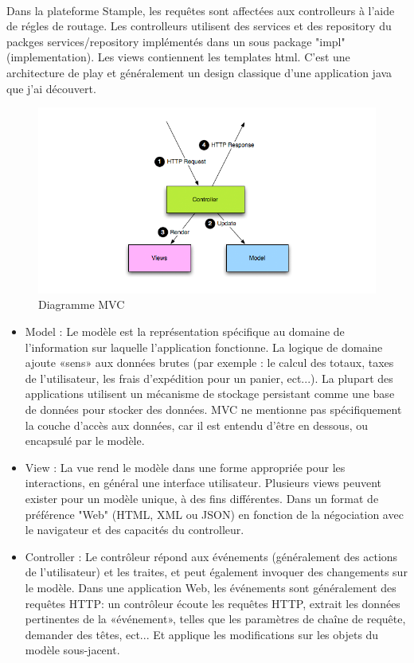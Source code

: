 \paragraph{}
Dans la plateforme Stample, les requêtes sont affectées aux controlleurs à l'aide de régles de routage. Les controlleurs utilisent des services et des repository du packges services/repository implémentés dans un sous package "impl" (implementation).
Les views contiennent les templates html.
C'est une architecture de play et généralement un design classique d'une application java que j'ai découvert.
\begin{figure}[H]
        \centering
                \centering
                \includegraphics[width=\textwidth]{diagrams_mvc.png}
                \caption{Diagramme MVC}
                \label{fig:Diagramme MVC}
       
\end{figure}
\begin{itemize}
\item Model : Le modèle est la représentation spécifique au domaine de l'information sur laquelle l'application fonctionne. La logique de domaine ajoute «sens» aux données brutes (par exemple : le calcul des totaux, taxes de l'utilisateur, les frais d'expédition pour un panier, ect...). La plupart des applications utilisent un mécanisme de stockage persistant comme une base de données pour stocker des données. MVC ne mentionne pas spécifiquement la couche d'accès aux données, car il est entendu d'être en dessous, ou encapsulé par le modèle.
\item View : La vue rend le modèle dans une forme appropriée pour les interactions, en général une interface utilisateur. Plusieurs views peuvent exister pour un modèle unique, à des fins différentes. Dans un format de préférence "Web" (HTML, XML ou JSON) en fonction de la négociation avec le navigateur et des capacités du controlleur.
\item Controller : Le contrôleur répond aux événements (généralement des actions de l'utilisateur) et les traites, et peut également invoquer des changements sur le modèle. Dans une application Web, les événements sont généralement des requêtes HTTP: un contrôleur écoute les requêtes HTTP, extrait les données pertinentes de la «événement», telles que les paramètres de chaîne de requête, demander des têtes, ect... Et applique les modifications sur les objets du modèle sous-jacent.

\end{itemize}

